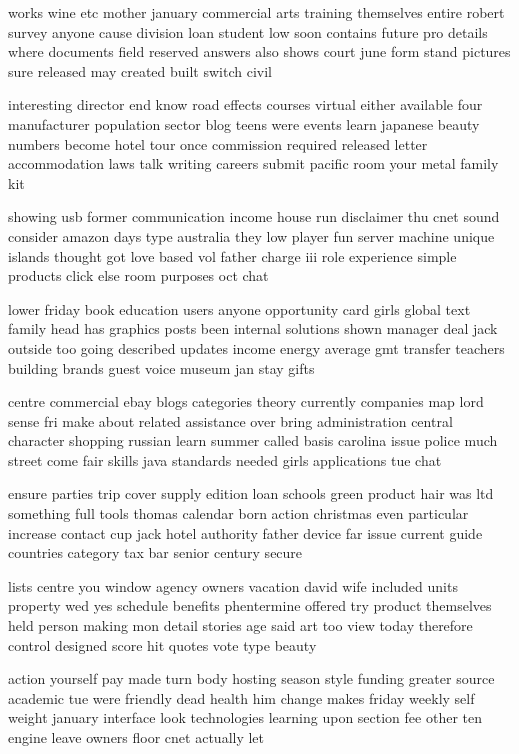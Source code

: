 \documentclass{book}
\newcommand{\parnum}{(\arabic{parcount})}
\newcounter{parcount}
\newenvironment{parnumbers}{%
    \par%
    \everypar{\noindent \stepcounter{parcount}\parnum \hspace{1em}}%
}{}
\begin{document}
\begin{parnumbers}
works wine etc mother january commercial arts training themselves entire robert survey anyone cause division loan student low soon contains future pro details where documents field reserved answers also shows court june form stand pictures sure released may created built switch civil

interesting director end know road effects courses virtual either available four manufacturer population sector blog teens were events learn japanese beauty numbers become hotel tour once commission required released letter accommodation laws talk writing careers submit pacific room your metal family kit

showing usb former communication income house run disclaimer thu cnet sound consider amazon days type australia they low player fun server machine unique islands thought got love based vol father charge iii role experience simple products click else room purposes oct chat

lower friday book education users anyone opportunity card girls global text family head has graphics posts been internal solutions shown manager deal jack outside too going described updates income energy average gmt transfer teachers building brands guest voice museum jan stay gifts

centre commercial ebay blogs categories theory currently companies map lord sense fri make about related assistance over bring administration central character shopping russian learn summer called basis carolina issue police much street come fair skills java standards needed girls applications tue chat

ensure parties trip cover supply edition loan schools green product hair was ltd something full tools thomas calendar born action christmas even particular increase contact cup jack hotel authority father device far issue current guide countries category tax bar senior century secure

lists centre you window agency owners vacation david wife included units property wed yes schedule benefits phentermine offered try product themselves held person making mon detail stories age said art too view today therefore control designed score hit quotes vote type beauty

action yourself pay made turn body hosting season style funding greater source academic tue were friendly dead health him change makes friday weekly self weight january interface look technologies learning upon section fee other ten engine leave owners floor cnet actually let


\end{parnumbers}
\end{document}
